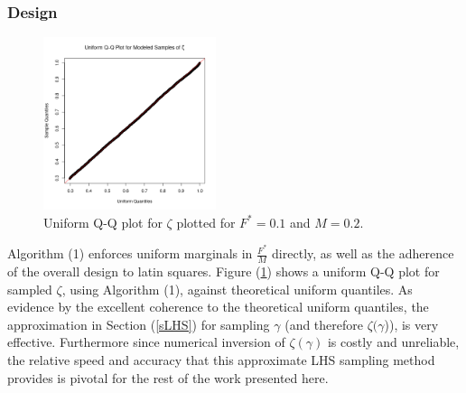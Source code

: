 \documentclass[12pt]{article}
\begin{document}
%
\subsubsection{Design}


%
\begin{figure}
\vspace{-2cm}
\includegraphics[width=0.45\textwidth]{../gpBias/qqUnif.png}
\vspace{-1cm} %
\caption{Uniform Q-Q plot for $\zeta$ plotted for $F^*=0.1$ and $M=0.2$.}
\label{qqZeta}
\end{figure}

%
Algorithm (1) enforces uniform marginals in $\frac{F^*}{M}$ directly, as well
as the adherence of the overall design to latin squares.  
Figure (\ref{qqZeta}) shows a uniform Q-Q plot for sampled $\zeta$, using 
Algorithm (1), against theoretical uniform quantiles. As evidence by the 
excellent coherence to the theoretical uniform quantiles, the approximation
in Section (\ref{sLHS}) for sampling $\gamma$ (and therefore $\zeta(\gamma$)), 
is very effective. 
Furthermore since numerical inversion of $\zeta(\gamma)$ is costly and 
unreliable, the relative speed and accuracy that this approximate LHS sampling 
method provides is pivotal for the rest of the work presented here. %

%
\end{document}
